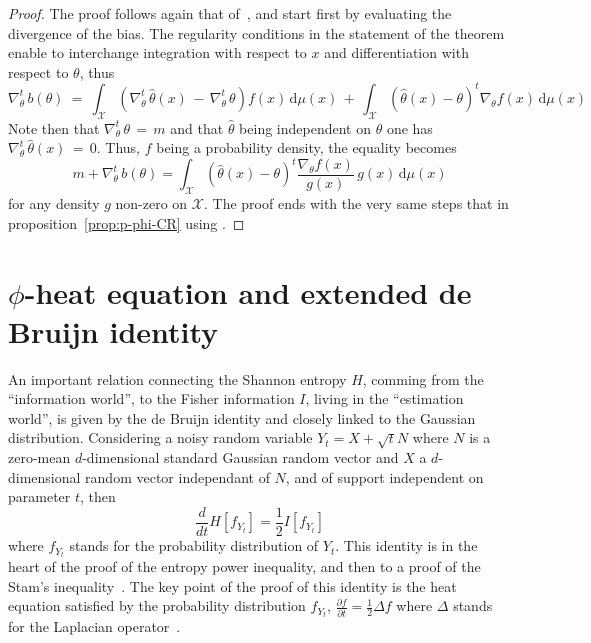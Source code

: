 \documentclass[english,sort&compress]{elsarticle}
\theoremstyle{definition}
\theoremstyle{plain}
\theoremstyle{plain}
\def\dmu{\mathrm{d}\mu}
\def\X{\mathcal{X}}
\begin{document}
\begin{proof}
  The proof  follows again that  of~\cite{Ber13}, and start first  by evaluating
  the divergence of the bias.  The regularity conditions in the statement of the
  theorem   enable  to  interchange   integration  with   respect  to   $x$  and
  differentiation with respect to $\theta$, thus
  \[
  \nabla_\theta^t  \,  b(\theta)  \:  =  \: \int_\X  \left(  \nabla_\theta^t  \,
    \widehat{\theta}(x)  \,  - \,  \nabla_\theta^t  \,  \theta  \right) f(x)  \,
  \dmu(x)  \,  +  \,  \int_\X  \left(  \widehat{\theta}(x)  -  \theta  \right)^t
  \nabla_\theta f(x) \, \dmu(x)
  \]
  Note   then  that   $\nabla_\theta^t  \,   \theta  \,   =  \,   m$   and  that
  $\widehat{\theta}$  being independent  on  $\theta$ one  has $\nabla_\theta^t  \,
  \widehat{\theta}(x) \,  = \, 0$. Thus,  $f$ being a  probability density, the
  equality becomes
  \[
  m + \nabla_\theta^t \, b(\theta) = \int_\X \left( \widehat{\theta}(x) - \theta
  \right)^t \frac{\nabla_\theta f(x)}{g(x)} \, g(x) \, \dmu(x)
  \]
  for any density $g$ non-zero on $\X$.  The proof ends with the very same steps
  that in proposition~\ref{prop:p-phi-CR} using \cite[Lemma2]{Ber13}.
\end{proof}



\section{$\phi$-heat equation and extended de Bruijn identity}
\label{sec:DeBruijn}

An  important relation  connecting the  Shannon  entropy $H$,  comming from  the
``information world'', to the Fisher information $I$, living in the ``estimation
world'', is given  by the de Bruijn identity and closely  linked to the Gaussian
distribution. Considering a  noisy random variable $Y_t = X  + \sqrt{t} N$ where
$N$ is  a zero-mean  $d$-dimensional standard Gaussian  random vector and  $X$ a
$d$-dimensional random vector independant of  $N$, and of support independent on
parameter  $t$,  then $$\frac{d}{dt}  H[f_{Y_t}]  =  \frac12 I[f_{Y_t}]$$  where
$f_{Y_t}$ stands for the probability  distribution of $Y_t$. This identity is in
the heart of the  proof of the entropy power inequality, and  then to a proof of
the  Stam's inequality~\cite{CovTho06}.  The  key  point of  the  proof of  this
identity  is  the  heat  equation  satisfied  by  the  probability  distribution
$f_{Y_t}$,  $\frac{\partial f}{\partial t}  = \frac12  \Delta f$  where $\Delta$
stands for the Laplacian operator~\cite{Wid75}.
\end{document}
